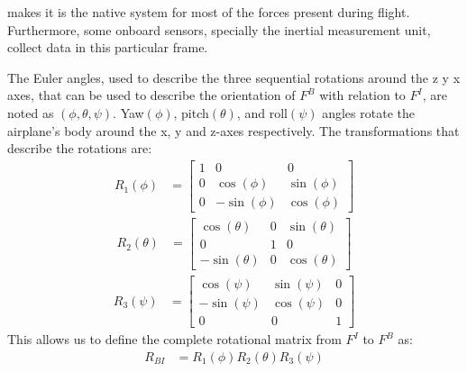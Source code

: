 \documentclass[conference]{IEEEtran}
\begin{document}
makes it is the native system for most of the forces present during flight.
Furthermore, some onboard sensors, specially the inertial measurement unit,
collect data in this particular frame.
\par
The Euler angles, used to describe the three sequential rotations around the z
y x axes, that can be used to describe the orientation of $F^B$ with relation
to $F^I$, are noted as $(\phi,\theta,\psi)$. Yaw$(\phi)$, pitch$(\theta)$, and
roll$(\psi)$ angles rotate the airplane's body around the x, y and z-axes
respectively. The transformations that describe the rotations are:
\begin{align}
    R_1(\phi) & = \begin{bmatrix}
                      1 & 0           & 0          \\
                      0 & \cos(\phi)  & \sin(\phi) \\
                      0 & -\sin(\phi) & \cos(\phi)
                  \end{bmatrix}
    \label{PhiEulerRotation}
\end{align}
\begin{align}
    R_2(\theta) & = \begin{bmatrix}
                        \cos(\theta)  & 0 & \sin(\theta) \\
                        0             & 1 & 0            \\
                        -\sin(\theta) & 0 & \cos(\theta)
                    \end{bmatrix}
    \label{thetaEulerRotation}
\end{align}
\begin{align}
    R_3(\psi) & = \begin{bmatrix}
                      \cos(\psi)  & \sin(\psi) & 0 \\
                      -\sin(\psi) & \cos(\psi) & 0 \\
                      0           & 0          & 1
                  \end{bmatrix}
    \label{PsiEulerRotation}
\end{align}
This allows us to define the complete rotational matrix from $F^I$ to $F^B$ as:
\begin{align}
    R_{BI} & =R_1(\phi)R_2(\theta)R_3(\psi)
    \label{BodyToEarthRotationMatrix}
\end{align}

\end{document}
